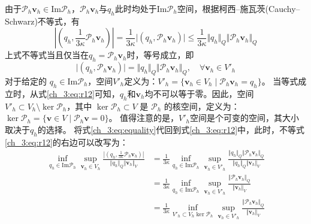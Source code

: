 由于$\mathcal P_h \boldsymbol v_h \in \mathrm{Im}\mathcal P_h$，$\mathcal P_h \boldsymbol v_h$与$q_h$此时均处于$\mathrm{Im}\mathcal P_h$空间，根据柯西--施瓦茨(Cauchy--Schwarz)不等式\cite{philippeg.2013}，有
\begin{equation}
    \left \vert \left (q_h,\frac{1}{3\kappa}\mathcal P_h \boldsymbol v_h \right ) \right \vert
    = \frac{1}{3\kappa} \vert (q_h,\mathcal P_h \boldsymbol v_h) \vert
    \le \frac{1}{3\kappa}\Vert q_h \Vert_Q \Vert \mathcal P_h \boldsymbol v_h \Vert_Q
\end{equation}
上式不等式当且仅当在$q_h=\mathcal P_h \boldsymbol v_h$时，等号成立，即
\begin{equation}\label{ch_3:eq:equality}
    \vert (q_h,\mathcal P_h \boldsymbol v_h) \vert = \Vert q_h \Vert_Q \Vert \mathcal P_h \boldsymbol v_h \Vert_Q, \quad \forall \boldsymbol v_h \in V'_h
\end{equation}
对于给定的 $q_h\in \mathrm{Im}\mathcal P_h$，空间$V'_h$定义为：$V'_h = \{ \boldsymbol v_h \in V_h \; \vert \; \mathcal P_h \boldsymbol v_h = q_h \}$。
当等式成立时，从式\eqref{ch_3:eq:r12}可知，$q_h$和$\boldsymbol v_h$均不可以等于零。因此，空间$V'_h \subset V_h\setminus \ker \mathcal P_h$，其中 $\ker \mathcal P_h \subset V$ 是 $\mathcal P_h$ 的核空间，定义为：$\ker \mathcal P_h = \{ \boldsymbol v \in V \;\vert\; \mathcal P_h \boldsymbol v = 0 \}$。
值得注意的是，$V'_h$空间是个可变的空间，其大小取决于$q_h$的选择。
将式\eqref{ch_3:eq:equality}代回到式\eqref{ch_3:eq:r12}中，此时，不等式\eqref{ch_3:eq:r12}的右边可以改写为：
\begin{equation}\label{ch_3:eq:r13}
    \begin{split}
    \inf_{q_h \in \mathrm{Im}\mathcal P_h}\sup_{\boldsymbol v_h\in V_h} \frac{\left \vert \left (q_h,\frac{1}{3\kappa}\mathcal P_h \boldsymbol v_h\right ) \right \vert}{\Vert q_h \Vert_Q \Vert \boldsymbol v_h \Vert_V} &=
    \frac{1}{3\kappa}\inf_{q_h \in \mathrm{Im}\mathcal P_h}\sup_{\boldsymbol v_h\in V'_h} \frac{\Vert q_h \Vert_Q \Vert \mathcal P_h \boldsymbol v_h \Vert_Q}{\Vert q_h \Vert_Q \Vert \boldsymbol v_h \Vert_V} \\
    &=\frac{1}{3\kappa}\inf_{q_h \in \mathrm{Im}\mathcal P_h}\sup_{\boldsymbol v_h\in V'_h} \frac{\Vert \mathcal P_h \boldsymbol v_h \Vert_Q}{\Vert \boldsymbol v_h \Vert_V} \\
    &=\frac{1}{3\kappa}\inf_{V'_h \subset V_h\ker \mathcal P_h} \sup_{\boldsymbol v_h\in V'_h} \frac{\Vert \mathcal P_h \boldsymbol v_h \Vert_Q}{\Vert \boldsymbol v_h \Vert_V} 
    \end{split}
\end{equation}
